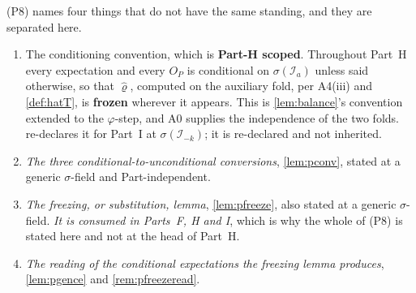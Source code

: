 \begin{definition}\label{def:pfold}
\textup{(P8)} names four things that do not have the same standing, and they are separated here.
\begin{enumerate}
\item[(a)] The conditioning convention, which is \textbf{Part-H scoped}. Throughout Part~H every
expectation and every $O_P$ is conditional on $\sigma(\mathcal I_a)$ unless said otherwise, so that
$\hat\varrho$, computed on the auxiliary fold, per A4(iii) and \cref{def:hatT}, is \textbf{frozen}
wherever it appears. This is \cref{lem:balance}'s convention extended to the $\varphi$-step, and A0
supplies the independence of the two folds.  re-declares it for Part~I at
$\sigma(\mathcal I_{-k})$; it is re-declared and not inherited.
\item[(b)] \emph{The three conditional-to-unconditional conversions}, \cref{lem:pconv}, stated at a generic
$\sigma$-field and Part-independent.
\item[(c)] \emph{The freezing, or substitution, lemma}, \cref{lem:pfreeze}, also stated at a generic
$\sigma$-field. \emph{It is consumed in Parts~F, H and I}, which is why the whole of \textup{(P8)} is
stated here and not at the head of Part~H.
\item[(d)] \emph{The reading of the conditional expectations the freezing lemma produces}, \cref{lem:pgence}
and \cref{rem:pfreezeread}.
\end{enumerate}
\end{definition}

